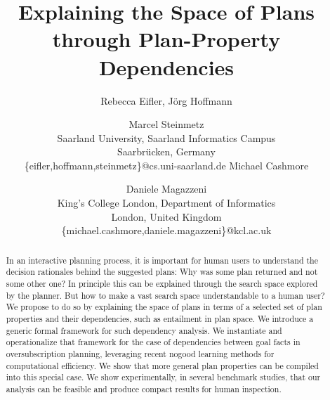\documentclass[letterpaper]{article}
\begin{document}
\nocopyright

\title{Explaining the Space of Plans through Plan-Property Dependencies}

\author{
\hspace{1.0cm}Rebecca Eifler, J\"org Hoffmann \and Marcel Steinmetz\\
  \hspace{1.0cm}Saarland University, Saarland Informatics Campus\\
  \hspace{1.0cm}Saarbr\"ucken, Germany\\
  \hspace{1.0cm}\{eifler,hoffmann,steinmetz\}@cs.uni-saarland.de
\And
\hspace{4.0cm}Michael Cashmore \and Daniele Magazzeni\\
\hspace{4.0cm}King's College London, Department of Informatics\\
\hspace{4.0cm}London, United Kingdom\\
\hspace{4.0cm}\{michael.cashmore,daniele.magazzeni\}@kcl.ac.uk 
}

\maketitle

\begin{abstract}
	In an interactive planning process, it is important for human users to understand the decision rationales behind the suggested plans: Why was some plan returned and not some other one? 
	In principle this can be explained through the search space explored by the planner.
	But how to make a vast search space understandable to a human user? 
	We propose to do so by explaining the space of plans in terms of a selected set of plan 
	properties and their dependencies, such as entailment in plan space. 
	We introduce a generic formal framework for such dependency analysis.
	We instantiate and operationalize that framework for the case of dependencies 
	between goal facts in oversubscription planning, leveraging recent nogood learning methods 
	for computational efficiency. We show that more general plan properties can be compiled 
	into this special case. We show experimentally, in several benchmark studies,  
	that our analysis can be feasible and produce compact results for human inspection. 
\end{abstract}













\medskip

\noindent

%
%
\end{document}
